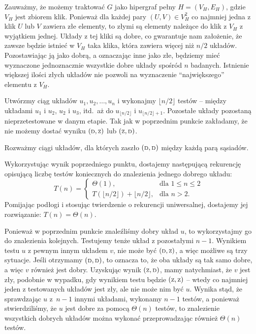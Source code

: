 Zauważmy, że możemy traktować $G$ jako hipergraf pełny $H=(V_H,E_H)$, gdzie $V_H$ jest zbiorem klik. Ponieważ dla każdej pary $(U,V)\in V_H^2$ co najmniej jedna z klik $U$ lub $V$ zawiera złe elementy, to złymi są elementy należące do klik z $V_H$ z wyjątkiem jednej. Układy z tej kliki są dobre, co gwarantuje nam założenie, że zawsze będzie istnieć w $V_H$ taka klika, która zawiera więcej niż $n/2$ układów. Pozostawiając ją jako dobrą, a oznaczając inne jako złe, będziemy mieć wyznaczone jednoznacznie wszystkie dobre układy spośród $n$ badanych. Istnienie większej ilości złych układów nie pozwoli na wyznaczenie ``największego'' elementu z $V_H$.

\subproblem %
Utwórzmy \wrong ciąg układów $u_1,u_2,\dots,u_n$ i wykonajmy $\lfloor n/2\rfloor$ testów -- między układami $u_1$ i $u_2$, $u_2$ i $u_3$, itd.\ aż do $u_{\lfloor n/2\rfloor}$ i $u_{\lfloor n/2\rfloor+1}$. Pozostałe układy pozostaną nieprzetestowane w danym etapie. Tak jak w poprzednim punkcie zakładamy, że nie możemy dostać wyniku $({\scriptstyle\rm D},{\scriptstyle\rm Z})$ lub $({\scriptstyle\rm Z},{\scriptstyle\rm D})$.

Rozważmy ciągi układów, dla których zaszło $({\scriptstyle\rm D},{\scriptstyle\rm D})$ między każdą parą sąsiadów. 

\subproblem %
Wykorzystując wynik poprzedniego punktu, dostajemy następującą rekurencję opisującą liczbę testów koniecznych do znalezienia jednego dobrego układu:
\[
	T(n) =
	\begin{cases}
		\Theta(1), & \text{dla $1\le n\le2$} \\
		T(\lfloor n/2\rfloor) + \lfloor n/2\rfloor, & \text{dla $n>2$}.
	\end{cases}
\]
Pomijając podłogi i stosując twierdzenie o rekurencji uniwersalnej, dostajemy jej rozwiązanie: $T(n)=\Theta(n)$.

Ponieważ w poprzednim punkcie znaleźliśmy dobry układ $u$, to wykorzystajmy go do znalezienia kolejnych. Testujemy tenże układ z pozostałymi $n-1$. Wynikiem testu $u$ z pewnym innym układem $v$, nie może być $({\scriptstyle\rm D},{\scriptstyle\rm Z})$, a więc możliwe są trzy sytuacje. Jeśli otrzymamy $({\scriptstyle\rm D},{\scriptstyle\rm D})$, to oznacza to, że oba układy są tak samo dobre, a więc $v$ również jest dobry. Uzyskując wynik $({\scriptstyle\rm Z},{\scriptstyle\rm D})$, mamy natychmiast, że $v$ jest zły, podobnie w wypadku, gdy wynikiem testu będzie $({\scriptstyle\rm Z},{\scriptstyle\rm Z})$ -- wtedy co najmniej jeden z testowanych układów jest zły, ale nie może nim być $u$. Wynika stąd, że sprawdzając $u$ z~$n-1$ innymi układami, wykonamy $n-1$ testów, a ponieważ stwierdziliśmy, że $u$ jest dobre za pomocą $\Theta(n)$ testów, to znalezienie wszystkich dobrych układów można wykonać przeprowadzając również $\Theta(n)$ testów.

